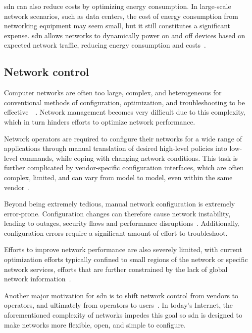 \gls{sdn} can also reduce costs by optimizing energy consumption. In large-scale network scenarios, such as data centers, the cost of energy consumption from networking equipment may seem small, but it still constitutes a significant expense. \gls{sdn} allows networks to dynamically power on and off devices based on expected network traffic, reducing energy consumption and costs~\cite{nunes_survey_2014}.

\subsection{Network control}
Computer networks are often too large, complex, and heterogeneous for conventional methods of configuration, optimization, and troubleshooting to be effective~\cite{xia_survey_2015}~\cite{kreutz_software-defined_2015}. Network management becomes very difficult due to this complexity, which in turn hinders efforts to optimize network performance.

Network operators are required to configure their networks for a wide range of applications through manual translation of desired high-level policies into low-level commands, while coping with changing network conditions. This task is further complicated by vendor-specific configuration interfaces, which are often complex, limited, and can vary from model to model, even within the same vendor~\cite{feamster_road_2013}. 

Beyond being extremely tedious, manual network configuration is extremely error-prone. Configuration changes can therefore cause network instability, leading to outages, security flaws and performance disruptions~\cite{nunes_survey_2014}. Additionally, configuration errors require a significant amount of effort to troubleshoot. 

Efforts to improve network performance are also severely limited, with current optimization efforts typically confined to small regions of the network or specific network services, efforts that are further constrained by the lack of global network information~\cite{xia_survey_2015}.

Another major motivation for \gls{sdn} is to shift network control from vendors to operators, and ultimately from operators to users~\cite{peterson_software-defined_2021}. In today's Internet, the aforementioned complexity of networks impedes this goal so \gls{sdn} is designed to make networks more flexible, open, and simple to configure.

